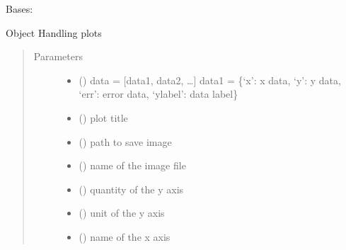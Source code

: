 \documentclass[letterpaper,10pt,english]{sphinxmanual}
\begin{document}
\begin{fulllineitems}
\label{\detokenize{api/postprocessing:plotter.Plotter}}
\sphinxAtStartPar
Bases: 

\sphinxAtStartPar
Object Handling plots
\begin{quote}\begin{description}
\item[{Parameters}] \leavevmode\begin{itemize}
\item {} 
\sphinxAtStartPar
{} () \textendash{} data = {[}data1, data2, …{]}
data1 = \{‘x’: x data, ‘y’: y data, ‘err’: error data,
‘ylabel’: data label\}

\item {} 
\sphinxAtStartPar
{} () \textendash{} plot title

\item {} 
\sphinxAtStartPar
{} () \textendash{} path to save image

\item {} 
\sphinxAtStartPar
{} () \textendash{} name of the image file

\item {} 
\sphinxAtStartPar
{} () \textendash{} quantity of the y axis

\item {} 
\sphinxAtStartPar
{} () \textendash{} unit of the y axis

\item {} 
\sphinxAtStartPar
{} () \textendash{} name of the x axis


\end{itemize}
\end{description}
\end{quote}
\end{fulllineitems}
\end{document}
